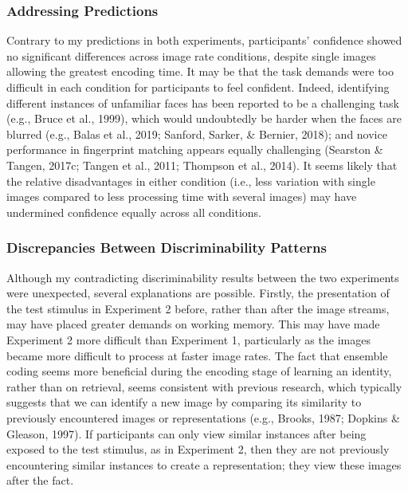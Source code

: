 \documentclass[
  english,
  man]{apa6}
\begin{document}
\hypertarget{addressing-predictions-2}{%
\subsubsection{Addressing Predictions}\label{addressing-predictions-2}}

Contrary to my predictions in both experiments, participants' confidence showed no significant differences across image rate conditions, despite single images allowing the greatest encoding time. It may be that the task demands were too difficult in each condition for participants to feel confident. Indeed, identifying different instances of unfamiliar faces has been reported to be a challenging task (e.g., Bruce et al., 1999), which would undoubtedly be harder when the faces are blurred (e.g., Balas et al., 2019; Sanford, Sarker, \& Bernier, 2018); and novice performance in fingerprint matching appears equally challenging (Searston \& Tangen, 2017c; Tangen et al., 2011; Thompson et al., 2014). It seems likely that the relative disadvantages in either condition (i.e., less variation with single images compared to less processing time with several images) may have undermined confidence equally across all conditions.

\hypertarget{discrepancies-between-discriminability-patterns}{%
\subsubsection{Discrepancies Between Discriminability Patterns}\label{discrepancies-between-discriminability-patterns}}

Although my contradicting discriminability results between the two experiments were unexpected, several explanations are possible. Firstly, the presentation of the test stimulus in Experiment 2 before, rather than after the image streams, may have placed greater demands on working memory. This may have made Experiment 2 more difficult than Experiment 1, particularly as the images became more difficult to process at faster image rates. The fact that ensemble coding seems more beneficial during the encoding stage of learning an identity, rather than on retrieval, seems consistent with previous research, which typically suggests that we can identify a new image by comparing its similarity to previously encountered images or representations (e.g., Brooks, 1987; Dopkins \& Gleason, 1997). If participants can only view similar instances after being exposed to the test stimulus, as in Experiment 2, then they are not previously encountering similar instances to create a representation; they view these images after the fact.
\end{document}
